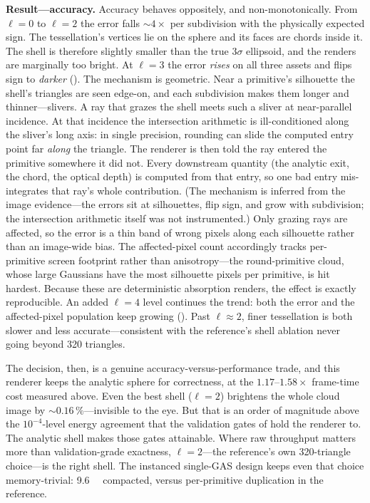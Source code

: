 \textbf{Result---accuracy.} Accuracy behaves oppositely, and non-monotonically. From $\ell{=}0$ to $\ell{=}2$ the error falls
${\sim}4\times$ per subdivision with the physically expected sign. The tessellation's vertices lie on
the sphere and its faces are chords inside it. The shell is therefore slightly smaller than the true
$3\sigma$ ellipsoid, and the renders are marginally too bright. At $\ell{=}3$ the
error \emph{rises} on all three assets and flips sign to \emph{darker}
(). The mechanism is geometric. Near a primitive's silhouette the
shell's triangles are seen edge-on, and each subdivision makes them longer and thinner---slivers. A
ray that grazes the shell meets such a sliver at near-parallel incidence. At that incidence the
intersection arithmetic is ill-conditioned along the sliver's long axis: in single precision,
rounding can slide the computed entry point far \emph{along} the triangle. The renderer is then
told the ray entered the primitive somewhere it did not.
Every downstream quantity (the analytic exit, the chord, the optical depth) is computed from that
entry, so one bad entry mis-integrates that ray's whole contribution. (The mechanism is inferred from the image evidence---the errors sit at silhouettes, flip sign, and grow with
subdivision; the intersection arithmetic itself was not instrumented.) Only grazing rays
are affected, so the error is a thin band of wrong pixels along each silhouette rather than
an image-wide bias. The affected-pixel count accordingly tracks per-primitive
screen footprint rather than anisotropy---the round-primitive cloud, whose large Gaussians have the
most silhouette pixels per primitive, is hit hardest. Because these are deterministic absorption renders, the effect is
exactly reproducible. An added $\ell{=}4$ level continues the trend: both the error and the
affected-pixel population keep growing (). Past $\ell{\approx}2$,
finer tessellation is both slower and less accurate---consistent with the reference's
shell ablation never going beyond \num{320} triangles.

The decision, then, is a genuine accuracy-versus-performance trade, and this renderer keeps the
analytic sphere for correctness, at the $1.17$--$1.58\times$ frame-time cost measured above. Even the best shell
($\ell{=}2$) brightens the whole cloud image by ${\sim}0.16\,\%$---invisible to the eye.
But that is an order of magnitude above the $10^{-4}$-level energy agreement that the validation gates of
 hold the renderer to. The analytic shell makes those gates attainable.
Where raw throughput matters more than validation-grade exactness,
$\ell{=}2$---the reference's own \num{320}-triangle choice---is the right shell.
The instanced single-GAS design keeps even that choice memory-trivial: \SI{9.6}{\kilo\byte} compacted,
versus per-primitive duplication in the reference.

